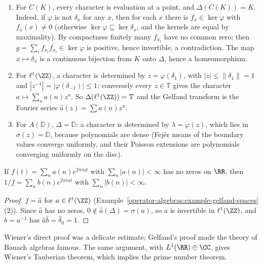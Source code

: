 \begin{example}\label{operator-algebras:example-gelfand-spaces}
\begin{enumerate}
\item For $C(K)$, every character is evaluation at a point, and $\Delta(C(K)) = K$. Indeed, if $\varphi$ is not $\delta_x$ for any $x$, then for each $x$ there is $f_x \in \ker\varphi$ with $f_x(x) \neq 0$ (otherwise
$\ker\varphi \subseteq \ker\delta_x$, and the kernels are equal by maximality). By compactness finitely many $f_{x_i}$ have no common zero; then $g = \sum_if_{x_i}\overline{f_{x_i}} \in \ker\varphi$ is positive, hence invertible,
a contradiction. The map $x \mapsto \delta_x$ is a continuous bijection from $K$ onto $\Delta$, hence a homeomorphism.
\item For $\ell^1(\ZZ)$, a character is determined by $z = \varphi(\delta_1)$, with $|z| \leq \|\delta_1\| = 1$ and $|z^{-1}| = |\varphi(\delta_{-1})| \leq 1$; conversely every $z \in \mathbb{T}$ gives the character
$a \mapsto \sum_na(n)z^n$. So $\Delta(\ell^1(\ZZ)) = \mathbb{T}$ and the Gelfand transform is the Fourier series $\hat a(z) = \sum a(n)z^n$.
\item For $A(\mathbb{D})$, $\Delta = \overline{\mathbb{D}}$: a character is determined by $\lambda = \varphi(z)$, which lies in $\sigma(z) = \overline{\mathbb{D}}$, because polynomials are dense (Fej\'er means of the boundary values
converge uniformly, and their Poisson extensions are polynomials converging uniformly on the disc).
\end{enumerate}
\end{example}

\begin{corollary}\label{operator-algebras:corollary-wiener}
If $f(t) = \sum_na(n)e^{2\pi int}$ with $\sum_n|a(n)| < \infty$ has no zeros on $\RR$, then $1/f = \sum_nb(n)e^{2\pi int}$ with $\sum_n|b(n)| < \infty$.
\end{corollary}

\begin{proof}
$f = \hat a$ for $a \in \ell^1(\ZZ)$ (Example~\ref{operator-algebras:example-gelfand-spaces}(2)). Since $\hat a$ has no zeros, $0 \notin \hat a(\Delta) = \sigma(a)$, so $a$ is invertible in $\ell^1(\ZZ)$, and $b = a^{-1}$ has
$\hat a\hat b = \hat\delta_0 = 1$.
\end{proof}

Wiener's direct proof was a delicate estimate; Gelfand's proof made the theory of Banach algebras famous. The same argument, with $L^1(\RR) \oplus \CC$, gives Wiener's Tauberian theorem, which implies the prime number
theorem.

